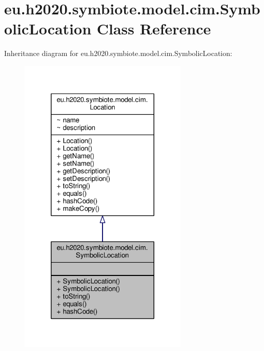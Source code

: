 \hypertarget{classeu_1_1h2020_1_1symbiote_1_1model_1_1cim_1_1SymbolicLocation}{}\section{eu.\+h2020.\+symbiote.\+model.\+cim.\+Symbolic\+Location Class Reference}
\label{classeu_1_1h2020_1_1symbiote_1_1model_1_1cim_1_1SymbolicLocation}


Inheritance diagram for eu.\+h2020.\+symbiote.\+model.\+cim.\+Symbolic\+Location\+:\nopagebreak
\begin{figure}[H]
\begin{center}
\leavevmode
\includegraphics[width=228pt]{classeu_1_1h2020_1_1symbiote_1_1model_1_1cim_1_1SymbolicLocation__inherit__graph}
\end{center}
\end{figure}


